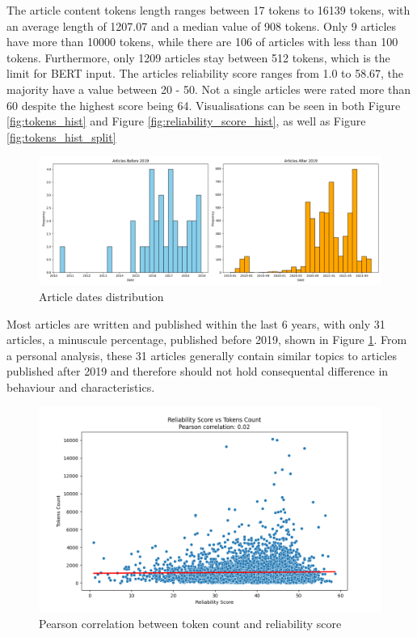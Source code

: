 The article content tokens length ranges between 17 tokens to 16139 tokens, with an average length of 1207.07 and a median value of 908 tokens. Only 9 articles have more than 10000 tokens, while there are 106 of articles with less than 100 tokens. Furthermore, only 1209 articles stay between 512 tokens, which is the limit for BERT input. The articles reliability score ranges from 1.0 to 58.67, the majority have a value between 20 - 50. Not a single articles were rated more than 60 despite the highest score being 64. Visualisations can be seen in both Figure \ref{fig:tokens_hist} and Figure \ref{fig:reliability_score_hist}, as well as Figure \ref{fig:tokens_hist_split}


\begin{figure}[htbp]
    \includegraphics[width=0.9\linewidth]{figures/dates_hist.png}
    \caption{Article dates distribution}
    \label{fig:dates_hist}
\end{figure}

Most articles are written and published within the last 6 years, with only 31 articles, a minuscule percentage, published before 2019, shown in Figure \ref{fig:dates_hist}. From a personal analysis, these 31 articles generally contain similar topics to articles published after 2019 and therefore should not hold consequental difference in behaviour and characteristics.


\begin{figure}[htbp]
    \centering
    \includegraphics[width=0.9\linewidth]{figures/correlation_tokens_reliability_score.png}
    \caption{Pearson correlation between token count and reliability score}
    \label{fig:pearson_correlation}
\end{figure}


